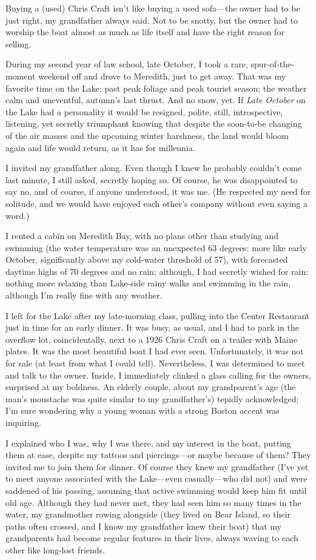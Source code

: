Buying a (used) Chris Craft isn't like buying a used sofa---the owner
had to be just right, my grandfather always said. Not to be snotty, but
the owner had to worship the boat almost as much as life itself and have
the right reason for selling.

During my second year of law school, late October, I took a rare,
spur-of-the-moment weekend off and drove to Meredith, just to get away.
That was my favorite time on the Lake: past peak foliage and peak
tourist season; the weather calm and uneventful, autumn's last thrust.
And no snow, yet. If \emph{Late October} on the Lake had a personality
it would be resigned, polite, still, introspective, listening, yet
secretly triumphant knowing that despite the soon-to-be changing of the
air masses and the upcoming winter harshness, the land would bloom again
and life would return, as it has for millennia.

I invited my grandfather along. Even though I knew he probably couldn't
come last minute, I still asked, secretly hoping so. Of course, he was
disappointed to say no, and of course, if anyone understood, it was me.
(He respected my need for solitude, and we would have enjoyed each
other's company without even saying a word.)

I rented a cabin on Meredith Bay, with no plans other than studying and
swimming (the water temperature was an unexpected 63 degrees: more like
early October, significantly above my cold-water threshold of 57), with
forecasted daytime highs of 70 degrees and no rain; although, I had
secretly wished for rain: nothing more relaxing than Lake-side rainy
walks and swimming in the rain, although I'm really fine with any
weather.

I left for the Lake after my late-morning class, pulling into the Center
Restaurant just in time for an early dinner. It was busy, as usual, and
I had to park in the overflow lot, coincidentally, next to a 1926 Chris
Craft on a trailer with Maine plates. It was the most beautiful boat I
had ever seen. Unfortunately, it was not for sale (at least from what I
could tell). Nevertheless, I was determined to meet and talk to the
owner. Inside, I immediately clinked a glass calling for the owners,
surprised at my boldness. An elderly couple, about my grandparent's age
(the man's moustache was quite similar to my grandfather's) tepidly
acknowledged; I'm sure wondering why a young woman with a strong Boston
accent was inquiring.

I explained who I was, why I was there, and my interest in the boat,
putting them at ease, despite my tattoos and piercings---or maybe
because of them? They invited me to join them for dinner. Of course they
knew my grandfather (I've yet to meet anyone associated with the
Lake---even casually---who did not) and were saddened of his passing,
assuming that active swimming would keep him fit until old age. Although
they had never met, they had seen him so many times in the water, my
grandmother rowing alongside (they lived on Bear Island, so their paths
often crossed, and I know my grandfather knew their boat) that my
grandparents had become regular features in their lives, always waving
to each other like long-lost friends.

